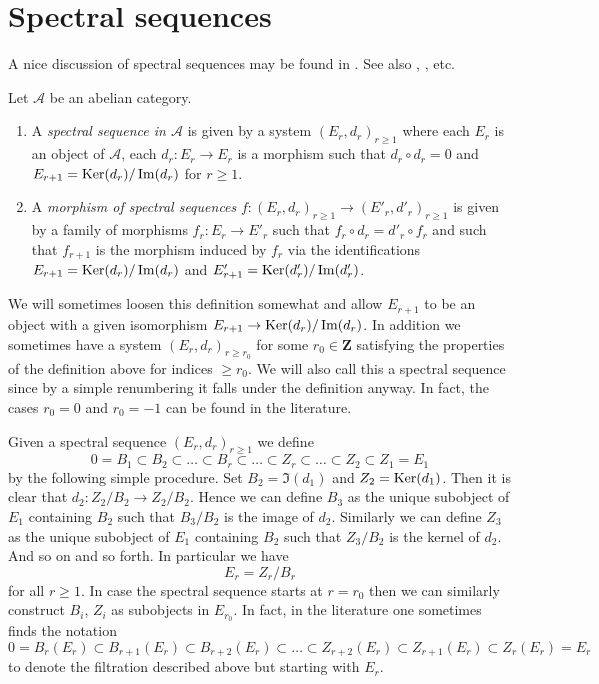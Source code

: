 \section{Spectral sequences}
\label{section-spectral-sequence}

\noindent
A nice discussion of spectral sequences may be found in
\cite{Eisenbud}. See also \cite{McCleary}, \cite{Lang}, etc.

\begin{definition}
\label{definition-spectral-sequence}
Let $\mathcal{A}$ be an abelian category.
\begin{enumerate}
\item A {\it spectral sequence in $\mathcal{A}$} is given by a
system $(E_r, d_r)_{r \geq 1}$ where each $E_r$ is an object
of $\mathcal{A}$, each $d_r : E_r \to E_r$ is a morphism such
that $d_r \circ d_r = 0$ and $E_{r + 1} = \mathop{\mathrm{Ker}}(d_r)/\mathop{\mathrm{Im}}(d_r)$
for $r \geq 1$.
\item A {\it morphism of spectral sequences}
$f : (E_r, d_r)_{r \geq 1} \to (E'_r, d'_r)_{r \geq 1}$ is
given by a family of morphisms $f_r : E_r \to E'_r$ such that
$f_r \circ d_r = d'_r \circ f_r$ and such that $f_{r + 1}$
is the morphism induced by $f_r$ via the identifications
$E_{r + 1} = \mathop{\mathrm{Ker}}(d_r)/\mathop{\mathrm{Im}}(d_r)$
and
$E'_{r + 1} = \mathop{\mathrm{Ker}}(d'_r)/\mathop{\mathrm{Im}}(d'_r)$.
\end{enumerate}
\end{definition}

\noindent
We will sometimes loosen this definition somewhat and allow $E_{r + 1}$
to be an object with a given isomorphism
$E_{r + 1} \to \mathop{\mathrm{Ker}}(d_r)/\mathop{\mathrm{Im}}(d_r)$.
In addition we sometimes have a system $(E_r, d_r)_{r \geq r_0}$
for some $r_0 \in \mathbf{Z}$ satisfying the properties of the definition above
for indices $\geq r_0$. We will also call this a spectral sequence since by
a simple renumbering it falls under the definition anyway.
In fact, the cases $r_0 = 0$ and $r_0 = -1$ can be found in the literature.

\medskip\noindent
Given a spectral sequence $(E_r, d_r)_{r \geq 1}$ we define
$$
0 = B_1 \subset B_2 \subset \ldots \subset B_r \subset \ldots
\subset Z_r \subset \ldots \subset Z_2 \subset Z_1 = E_1
$$
by the following simple procedure. Set $B_2 = \Im(d_1)$
and $Z_2 = \mathop{\mathrm{Ker}}(d_1)$. Then it is clear that
$d_2 : Z_2/B_2 \to Z_2/B_2$. Hence we can define $B_3$ as the unique
subobject of $E_1$ containing $B_2$ such that $B_3/B_2$ is the image
of $d_2$. Similarly we can define $Z_3$ as the unique subobject of
$E_1$ containing $B_2$ such that $Z_3/B_2$ is the kernel of $d_2$.
And so on and so forth. In particular we have
$$
E_r = Z_r/B_r
$$
for all $r \geq 1$. In case the spectral sequence starts at $r = r_0$
then we can similarly construct $B_i$, $Z_i$ as subobjects in $E_{r_0}$.
In fact, in the literature one sometimes finds the notation
$$
0 = B_r(E_r) \subset B_{r + 1}(E_r) \subset B_{r + 2}(E_r) \subset \ldots
\subset Z_{r + 2}(E_r) \subset Z_{r + 1}(E_r) \subset Z_r(E_r) = E_r
$$
to denote the filtration described above but starting with $E_r$.

